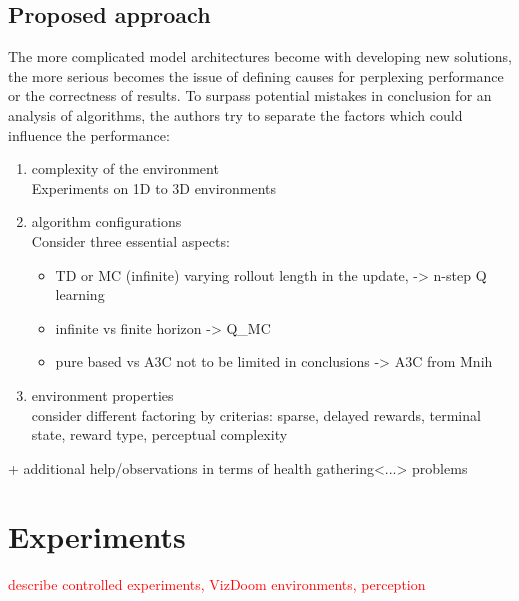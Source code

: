 \documentclass{article}
\begin{document}
\subsection{Proposed approach}
\color{red}
	The more complicated model architectures become with developing
    new solutions, the more serious becomes the issue of defining causes 
    for perplexing performance
    or the correctness of results. 
    To surpass potential mistakes in conclusion for an analysis of algorithms,
    the authors try to separate the factors which could influence
    the performance:
    \begin{enumerate}
    \item complexity of the environment  \\
    Experiments on 1D to 3D environments
    \item algorithm configurations \\
    Consider three essential aspects: 
    \begin{itemize}
      \item TD or MC (infinite) varying rollout length in the
      update, -> n-step Q learning
      \item infinite vs finite horizon -> Q\_MC
      \item pure based vs A3C not to be limited in conclusions -> A3C from Mnih
    \end{itemize}
    \item environment properties \\
    consider different factoring by criterias: sparse, delayed rewards, terminal
    state, reward type, perceptual complexity
    \end{enumerate}
    
    + additional help/observations in terms of health gathering<...> problems

\color{black}
	

\section{Experiments}

 
 \textcolor{red}{describe controlled experiments, VizDoom environments, perception}
\end{document}

